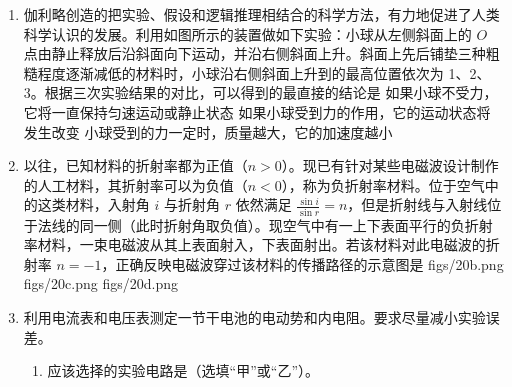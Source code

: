 \documentclass[\gkver]{gaokaozhenti}
\begin{document}
\begin{enumerate}
\item
伽利略创造的把实验、假设和逻辑推理相结合的科学方法，有力地促进了人类科学认识的发展。利用如图所示的装置做如下实验：小球从左侧斜面上的 $O$ 点由静止释放后沿斜面向下运动，并沿右侧斜面上升。斜面上先后铺垫三种粗糙程度逐渐减低的材料时，小球沿右侧斜面上升到的最高位置依次为 1、2、3。根据三次实验结果的对比，可以得到的最直接的结论是
{如果小球不受力，它将一直保持匀速运动或静止状态}
{如果小球受到力的作用，它的运动状态将发生改变}
{小球受到的力一定时，质量越大，它的加速度越小}

\item
以往，已知材料的折射率都为正值（$n>0$）。现已有针对某些电磁波设计制作的人工材料，其折射率可以为负值（$n<0$），称为负折射率材料。位于空气中的这类材料，入射角 $i$ 与折射角 $r$ 依然满足 $\frac{\sin i}{\sin r}=n$，但是折射线与入射线位于法线的同一侧（此时折射角取负值）。现空气中有一上下表面平行的负折射率材料，一束电磁波从其上表面射入，下表面射出。若该材料对此电磁波的折射率 $n=-1$，正确反映电磁波穿过该材料的传播路径的示意图是
{figs/20b.png}
{figs/20c.png}
{figs/20d.png}

\item
利用电流表和电压表测定一节干电池的电动势和内电阻。要求尽量减小实验误差。
\begin{enumerate}
	\item
	应该选择的实验电路是（选填“甲”或“乙”）。


\end{enumerate}
\end{enumerate}
\end{document}
